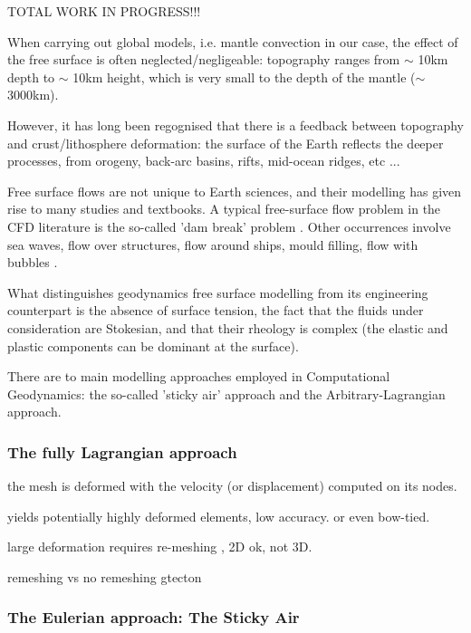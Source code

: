 
TOTAL WORK IN PROGRESS!!!

When carrying out global models, i.e.  mantle convection in our case, the effect of the free surface
is often neglected/negligeable: topography ranges from $\sim$ 10km depth to $\sim$ 10km height, which 
is very small to the depth of the mantle ($\sim$ 3000km). 

However, it has long been regognised that there is a feedback between topography and crust/lithosphere
deformation: the surface of the Earth reflects the deeper processes, from orogeny, back-arc basins, 
rifts, mid-ocean ridges, etc ...

Free surface flows are not unique to Earth sciences, and their modelling has given rise to many studies 
and textbooks. A typical free-surface flow problem in the CFD literature is the so-called 'dam break' 
problem \cite{moeb99,bacp07,liir07,lemx08,homa09,anco09}. Other occurrences involve 
sea waves, flow over structures, flow around ships, mould filling, flow with bubbles \cite{liir07}.

 
What distinguishes geodynamics free surface modelling from its engineering 
counterpart is the absence of surface tension, the fact that the fluids under consideration are
Stokesian, and that their rheology is complex (the elastic and plastic components can be 
dominant at the surface).

There are to main modelling approaches employed in Computational Geodynamics: the so-called 
'sticky air' approach and the Arbitrary-Lagrangian approach.

\subsubsection{The fully Lagrangian approach}

the mesh is deformed with the velocity (or displacement) computed on its nodes. 

yields potentially highly deformed elements, low accuracy. or even bow-tied. 

large deformation requires re-meshing , 2D ok, not 3D. 

remeshing vs no remeshing gtecton



\subsubsection{The Eulerian approach: The Sticky Air}

